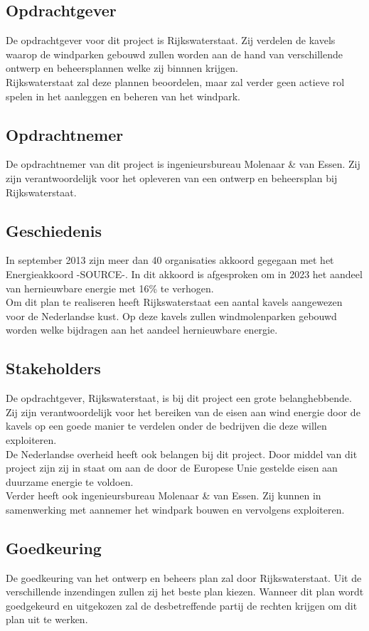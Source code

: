 \documentclass[numbers=endperiod]{scrartcl}
\newcommand{\whitespace}{\vspace*{2 mm} \\}%
\begin{document}
	\subsection{Opdrachtgever}
	De opdrachtgever voor dit project is Rijkswaterstaat. Zij verdelen de kavels waarop de windparken gebouwd zullen worden aan de hand van verschillende ontwerp en beheersplannen welke zij binnnen krijgen.
	\whitespace
	Rijkswaterstaat zal deze plannen beoordelen, maar zal verder geen actieve rol spelen in het aanleggen en beheren van het windpark.
	\subsection{Opdrachtnemer}
	De opdrachtnemer van dit project is ingenieursbureau Molenaar \& van Essen. Zij zijn verantwoordelijk voor het opleveren van een ontwerp en beheersplan bij Rijkswaterstaat.
	\subsection{Geschiedenis}
	In september 2013 zijn meer dan 40 organisaties akkoord gegegaan met het Energieakkoord -SOURCE-. In dit akkoord is afgesproken om in 2023 het aandeel van hernieuwbare energie met 16\% te verhogen.
	\whitespace
	Om dit plan te realiseren heeft Rijkswaterstaat een aantal kavels aangewezen voor de Nederlandse kust. Op deze kavels zullen windmolenparken gebouwd worden welke bijdragen aan het aandeel hernieuwbare energie.
	\subsection{Stakeholders}
	De opdrachtgever, Rijkswaterstaat, is bij dit project een grote belanghebbende. Zij zijn verantwoordelijk voor het bereiken van de eisen aan wind energie door de kavels op een goede manier te verdelen onder de bedrijven die deze willen exploiteren.
	\whitespace
	De Nederlandse overheid heeft ook belangen bij dit project. Door middel van dit project zijn zij in staat om aan de door de Europese Unie gestelde eisen aan duurzame energie te voldoen.
	\whitespace
	Verder heeft ook ingenieursbureau Molenaar \& van Essen. Zij kunnen in samenwerking met aannemer het windpark bouwen en vervolgens exploiteren.
	\subsection{Goedkeuring}
	De goedkeuring van het ontwerp en beheers plan zal door Rijkswaterstaat. Uit de verschillende inzendingen zullen zij het beste plan kiezen. Wanneer dit plan wordt goedgekeurd en uitgekozen zal de desbetreffende partij de rechten krijgen om dit plan uit te werken.
	\newpage
\end{document}
